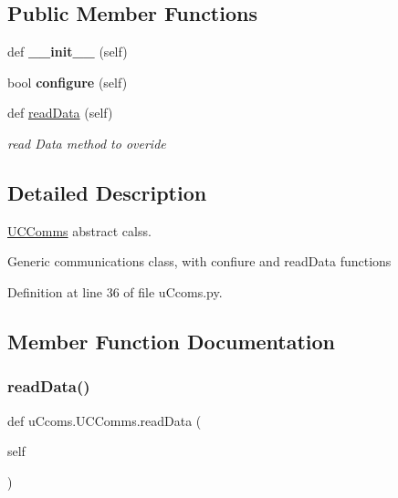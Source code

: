 \subsection*{Public Member Functions}
\begin{DoxyCompactItemize}
\item 
\mbox{\label{classu_ccoms_1_1_u_c_comms_a0f3ebc997236983be0c9cec861735916}} 
def {\bfseries \+\_\+\+\_\+init\+\_\+\+\_\+} (self)
\item 
\mbox{\label{classu_ccoms_1_1_u_c_comms_a0613de64f804aa3e5b74e93aada23a93}} 
bool {\bfseries configure} (self)
\item 
def \mbox{\hyperlink{classu_ccoms_1_1_u_c_comms_aba3c5a6a0e277e721590343626b5a700}{read\+Data}} (self)
\begin{DoxyCompactList}\small\item\em read Data method to overide \end{DoxyCompactList}\end{DoxyCompactItemize}


\subsection{Detailed Description}
\mbox{\hyperlink{classu_ccoms_1_1_u_c_comms}{U\+C\+Comms}} abstract calss. 

Generic communications class, with confiure and read\+Data functions 

Definition at line 36 of file u\+Ccoms.\+py.



\subsection{Member Function Documentation}
\mbox{\label{classu_ccoms_1_1_u_c_comms_aba3c5a6a0e277e721590343626b5a700}} 
\subsubsection{\texorpdfstring{readData()}{readData()}}
{\footnotesize\ttfamily def u\+Ccoms.\+U\+C\+Comms.\+read\+Data (\begin{DoxyParamCaption}\item[{}]{self }\end{DoxyParamCaption})}



